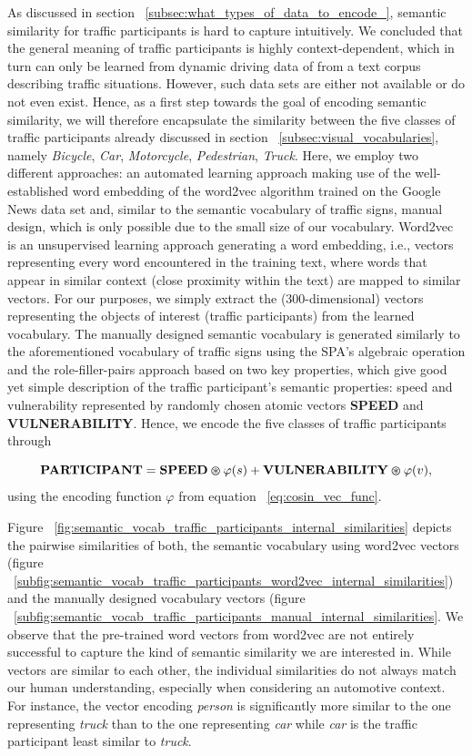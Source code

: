 As discussed in section ~\ref{subsec:what_types_of_data_to_encode_}, semantic similarity for traffic participants is hard to capture intuitively.
We concluded that the general meaning of traffic participants is highly context-dependent, which in turn can only be learned from dynamic driving data of from a text corpus describing traffic situations.
However, such data sets are either not available or do not even exist.
Hence, as a first step towards the goal of encoding semantic similarity, we will therefore encapsulate the similarity between the five classes of traffic participants already discussed in section ~\ref{subsec:visual_vocabularies}, namely \emph{Bicycle}, \emph{Car}, \emph{Motorcycle}, \emph{Pedestrian}, \emph{Truck}.
Here, we employ two different approaches: an automated learning approach making use of the well-established word embedding of the word2vec algorithm \cite{Mikolov2013} trained on the Google News data set and, similar to the semantic vocabulary of traffic signs, manual design, which is only possible due to the small size of our vocabulary.
Word2vec is an unsupervised learning approach generating a word embedding, i.e., vectors representing every word encountered in the training text, where words that appear in similar context (close proximity within the text) are mapped to similar vectors. 
For our purposes, we simply extract the (\num{300}-dimensional) vectors representing the objects of interest (traffic participants) from the learned vocabulary.
The manually designed semantic vocabulary is generated similarly to the aforementioned vocabulary of traffic signs using the \ac{SPA}'s algebraic operation and the role-filler-pairs approach based on two key properties, which give good yet simple description of the traffic participant's semantic properties: speed and vulnerability represented by randomly chosen atomic vectors \textbf{SPEED} and \textbf{VULNERABILITY}.
Hence, we encode the five classes of traffic participants through

\begin{equation}
\label{eq:semantic_vocab_traffic_participants}
\mathbf{PARTICIPANT} = \mathbf{SPEED} \varoast \varphi(s) + \mathbf{VULNERABILITY} \varoast \varphi(v),
\end{equation}
using the encoding function $\varphi$ from equation ~\ref{eq:cosin_vec_func}.

Figure ~\ref{fig:semantic_vocab_traffic_participants_internal_similarities} depicts the pairwise similarities of both, the semantic vocabulary using word2vec vectors (figure ~\ref{subfig:semantic_vocab_traffic_participants_word2vec_internal_similarities}) and the manually designed vocabulary vectors (figure ~\ref{subfig:semantic_vocab_traffic_participants_manual_internal_similarities}.
We observe that the pre-trained word vectors from word2vec are not entirely successful to capture the kind of semantic similarity we are interested in.
While vectors are similar to each other, the individual similarities do not always match our human understanding, especially when considering an automotive context.
For instance, the vector encoding \emph{person} is significantly more similar to the one representing \emph{truck} than to the one representing \emph{car} while \emph{car} is the traffic participant least similar to \emph{truck}. 

